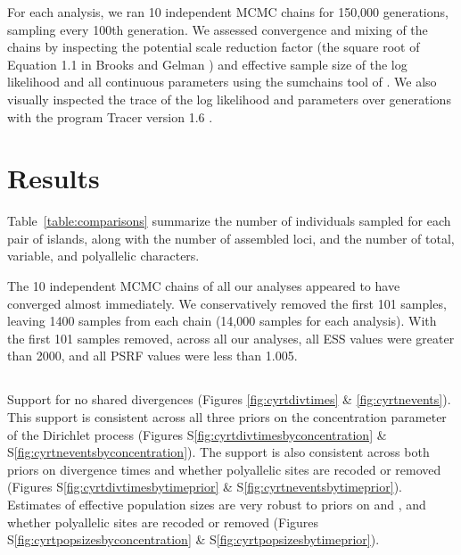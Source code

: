 For each analysis, we ran 10 independent MCMC chains for 150,000 generations,
sampling every 100th generation.
We assessed convergence and mixing of the chains by inspecting the potential
scale reduction factor (the square root of Equation 1.1 in Brooks and Gelman
\citeyear{Brooks1998}) and effective sample size \citep{Gong2014} of the log
likelihood and all continuous parameters using the sumchains tool of
\pycoevolity.
We also visually inspected the trace of the log likelihood and parameters over
generations with the program Tracer version 1.6 \citep{Tracer16}.


\section{Results}

Table~\ref{table:comparisons} summarize the number of individuals sampled for
each pair of islands, along with the number of assembled loci, and the number
of total, variable, and polyallelic characters.

The 10 independent MCMC chains of all our \ecoevolity analyses appeared to have
converged almost immediately.
We conservatively removed the first 101 samples, leaving 1400 samples from each
chain (14,000 samples for each analysis).
With the first 101 samples removed, across all our analyses, all ESS values
were greater than 2000, and all PSRF values were less than 1.005.

\subsection{}
Support for no shared divergences
(Figures \ref{fig:cyrtdivtimes} \& \ref{fig:cyrtnevents}).
This support is consistent across all three priors on the concentration
parameter of the Dirichlet process
(Figures S\ref{fig:cyrtdivtimesbyconcentration} \& S\ref{fig:cyrtneventsbyconcentration}).
The support is also consistent across both priors on divergence times
and whether polyallelic sites are recoded or removed
(Figures S\ref{fig:cyrtdivtimesbytimeprior} \& S\ref{fig:cyrtneventsbytimeprior}).
Estimates of effective population sizes are very robust to
priors on \concentration and \divtime, and whether polyallelic sites
are recoded or removed
(Figures S\ref{fig:cyrtpopsizesbyconcentration} \& S\ref{fig:cyrtpopsizesbytimeprior}).

